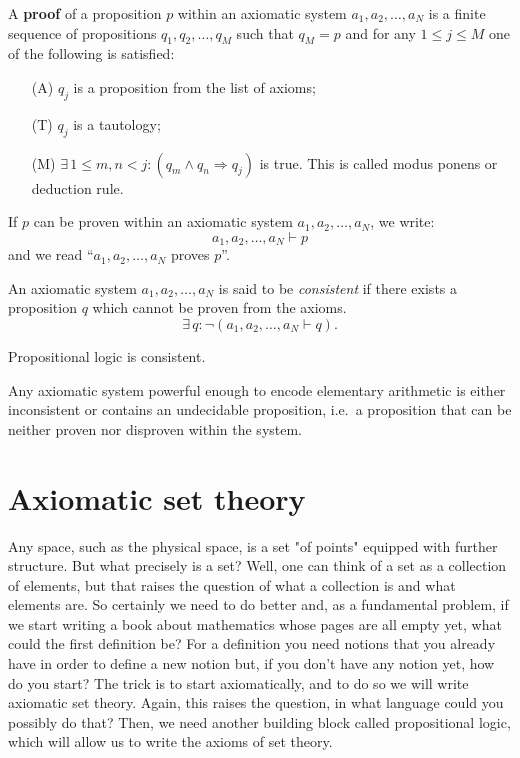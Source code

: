 \documentclass[root.tex]{subfiles}
\begin{document}
\begin{mydef}
  A \textbf{proof} of a proposition $p$ within an axiomatic system $a_1,a_2,\ldots,a_N$ is a finite sequence of propositions $q_1,q_2,\ldots,q_M$ such that $q_M=p$ and for any $1\leq j \leq M$ one of the following is satisfied:
\begin{enumerate}
\item[(A)] $q_j$ is a proposition from the list of axioms;
\item[(T)] $q_j$ is a tautology;
\item[(M)] $\exists \, 1\leq m,n <j : (q_m\land q_n \Rightarrow q_j)$ is true. This is called modus ponens or deduction rule.
\end{enumerate}
\end{mydef}
\begin{remark}

If $p$ can be proven within an axiomatic system $a_1,a_2,\ldots,a_N$, we write:
$$
a_1,a_2,\ldots,a_N \vdash p
$$
and we read ``$a_1,a_2,\ldots,a_N$ proves $p$''.
\end{remark}

\begin{mydef}
An axiomatic system $a_1,a_2,\ldots,a_N$ is said to be \emph{consistent} if there exists a proposition $q$ which cannot be proven from the axioms.
$$
\exists \, q : \neg (a_1,a_2,\ldots,a_N \vdash q).
$$
\end{mydef}

\begin{theorem}
  Propositional logic is consistent.
\end{theorem}

\begin{theorem}[Godel]
Any axiomatic system powerful enough to encode elementary arithmetic is either inconsistent or contains an undecidable proposition, i.e.\ a proposition that can be neither proven nor disproven within the system.
\end{theorem}

\chapter{Axiomatic set theory}%

Any space, such as the physical space, is a set "of points" equipped with further structure. But what precisely is a set? Well, one can think of a set as a collection of elements, but that raises the question of what a collection is and what elements are. So certainly we need to do better and, as a fundamental problem, if we start writing a book about mathematics whose pages are all empty yet, what could the first definition be? For a definition you need notions that you already have in order to define a new notion but, if you don't have any notion yet, how do you start? The trick is to start axiomatically, and to do so we will write axiomatic set theory. Again, this raises the question, in what language could you possibly do that? Then, we need another building block called propositional logic, which will allow us to write the axioms of set theory. 
\end{document}
